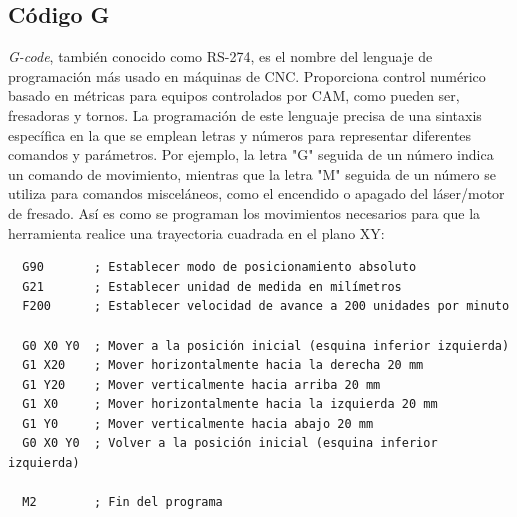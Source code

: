\subsection{Código G}
\label{sec:gcode}
\textit{G-code}, también conocido como RS-274, es el nombre del lenguaje de programación más usado en máquinas de \ac{CNC}. 
Proporciona control numérico basado en métricas para equipos controlados por \ac{CAM}, como pueden ser, fresadoras y tornos. 
La programación de este lenguaje precisa de una sintaxis específica en la que se emplean letras y números para representar 
diferentes comandos y parámetros. Por ejemplo, la letra "G" seguida de un número indica un comando de movimiento, mientras 
que la letra "M" seguida de un número se utiliza para comandos misceláneos, como el encendido o apagado del láser/motor de fresado.
Así es como se programan los movimientos necesarios para que la herramienta realice una trayectoria cuadrada en el plano XY:
\begin{verbatim}
  G90       ; Establecer modo de posicionamiento absoluto
  G21       ; Establecer unidad de medida en milímetros
  F200      ; Establecer velocidad de avance a 200 unidades por minuto 
  
  G0 X0 Y0  ; Mover a la posición inicial (esquina inferior izquierda) 
  G1 X20    ; Mover horizontalmente hacia la derecha 20 mm
  G1 Y20    ; Mover verticalmente hacia arriba 20 mm
  G1 X0     ; Mover horizontalmente hacia la izquierda 20 mm
  G1 Y0     ; Mover verticalmente hacia abajo 20 mm
  G0 X0 Y0  ; Volver a la posición inicial (esquina inferior izquierda)
  
  M2        ; Fin del programa
\end{verbatim}

